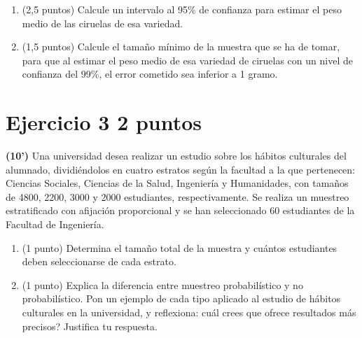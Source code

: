 \documentclass[11pt]{article}
\begin{document}
\begin{enumerate}[label=(\alph*)]

  \item (2,5 puntos)  Calcule un intervalo al 95\% de confianza para estimar el peso medio de las ciruelas de esa variedad.

  

  \item (1,5 puntos)  Calcule el tamaño mínimo de la muestra que se ha de tomar, para que al estimar el peso medio de esa variedad de ciruelas con un nivel de confianza del 99\%, el error cometido sea inferior a 1 gramo.

  

\end{enumerate}

\clearpage
\section*{Ejercicio 3 \hfill 2 puntos}  \textbf{(10')} Una universidad desea realizar un estudio sobre los hábitos culturales del alumnado, dividiéndolos en cuatro estratos según la facultad a la que pertenecen: Ciencias Sociales, Ciencias de la Salud, Ingeniería y Humanidades, con tamaños de 4800, 2200, 3000 y 2000 estudiantes, respectivamente. Se realiza un muestreo estratificado con afijación proporcional y se han seleccionado 60 estudiantes de la Facultad de Ingeniería.

\begin{enumerate}[label=(\alph*)]
  \item (1 punto)  Determina el tamaño total de la muestra y cuántos estudiantes deben seleccionarse de cada estrato.
  
  

  \item (1 punto)  Explica la diferencia entre muestreo probabilístico y no probabilístico. Pon un ejemplo de cada tipo aplicado al estudio de hábitos culturales en la universidad, y reflexiona: \textquestiondown{}cuál crees que ofrece resultados más precisos? Justifica tu respuesta.

  
\end{enumerate}
\end{document}
